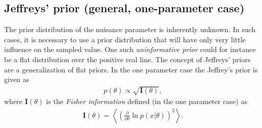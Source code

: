 \subsection{Jeffreys' prior (general, one-parameter case)}
The prior distribution of the nuisance parameter is inherently unknown.
In such cases, it is necessary to use a prior distribution that will have only very little influence on the sampled value.
One such \textit{uninformative prior} could for instance be a flat distribution over the positive real line.
The concept of Jeffreys' priors are a generalization of flat priors. In the one parameter case the Jeffrey's prior is given as 
\begin{eqnarray}
    p(\theta) \propto \sqrt{\mathbf{I}(\theta)},
\end{eqnarray}
where $\mathbf{I}(\theta)$ is the \textit{Fisher information} defined (in the one parameter case) as
\begin{eqnarray}
    \mathbf{I}(\theta) = \left\langle \left( \frac{\partial}{\partial\theta} \ln p(x|\theta) \right)^2 \right\rangle.
\end{eqnarray}


